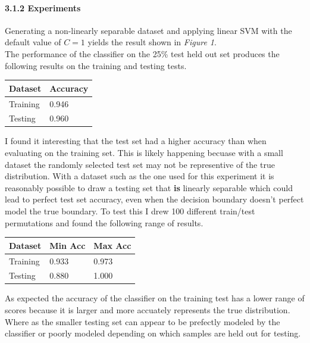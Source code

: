 \documentclass[11pt]{article}
\begin{document}
    \hypertarget{experiments}{%
\paragraph{3.1.2 Experiments}\label{experiments}}

Generating a non-linearly separable dataset and applying linear SVM with
the default value of \(C=1\) yields the result shown in \emph{Figure
1}.\\
The performance of the classifier on the 25\% test held out set produces
the following results on the training and testing tests.

\begin{longtable}[]{@{}ll@{}}
\toprule
Dataset & Accuracy \\
\midrule
\endhead
Training & 0.946 \\
Testing & 0.960 \\
\bottomrule
\end{longtable}

I found it interesting that the test set had a higher accuracy than when
evaluating on the training set. This is likely happening becuase with a
small dataset the randomly selected test set may not be representive of
the true distribution. With a dataset such as the one used for this
experiment it is reasonably possible to draw a testing set that
\textbf{is} linearly separable which could lead to perfect test set
accuracy, even when the decision boundary doesn't perfect model the true
boundary. To test this I drew 100 different train/test permutations and
found the following range of results.

\begin{longtable}[]{@{}lll@{}}
\toprule
Dataset & Min Acc & Max Acc \\
\midrule
\endhead
Training & 0.933 & 0.973 \\
Testing & 0.880 & 1.000 \\
\bottomrule
\end{longtable}

As expected the accuracy of the classifier on the training test has a
lower range of scores because it is larger and more accuately represents
the true distribution. Where as the smaller testing set can appear to be
prefectly modeled by the classifier or poorly modeled depending on which
samples are held out for testing.
\end{document}
